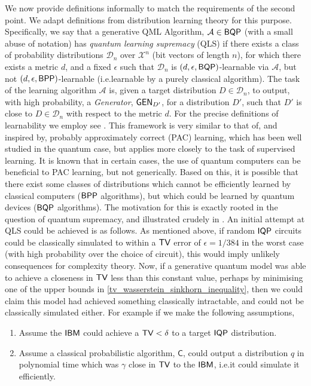 We now provide definitions informally to match the requirements of the second point. We adapt definitions from distribution learning theory\cite{kearns_learnability_1994} for this purpose. Specifically, we say that a generative QML Algorithm, $\mathcal{A}\in \textsf{BQP}$ (with a small abuse of notation) has %
\textit{quantum learning supremacy} (QLS) if there exists a class of probability distributions 
$\mathcal{D}_n$ over $\mathcal X^n$ (bit vectors of length $n$), 
for which there exists a metric $d$, and a fixed $\epsilon$ such that 
$\mathcal{D}_n$ is $(d ,\epsilon, \textsf{BQP})$-learnable via $\mathcal{A}$, 
but not $\left( d ,\epsilon, \textsf{BPP} \right)$-learnable (i.e.\@ learnable by a purely classical algorithm). The task of the learning algorithm $\mathcal{A}$ is, given a target distribution $D\in \mathcal D_n$,
to output, with high probability, a \textit{Generator}, 
$\operatorname{\textsf{GEN}}_{D'}$, for a distribution $D'$, 
such that $D'$ is close to $D \in \mathcal{D}_n$ with respect to the metric $d$. 
For the precise definitions of learnability we employ see .
This framework is very similar to that of, and inspired by, probably approximately correct (PAC) learning, which has been well studied in the quantum case\cite{arunachalam_survey_2017}, but applies more closely to the task of supervised learning. It is known that in certain cases, the use of quantum computers can be beneficial to PAC learning, but not generically\cite{arunachalam_quantum_2019}. Based on this, it is possible that there exist some classes of distributions which cannot be efficiently learned by classical computers ($\textsf{BPP}$ algorithms), but which could be learned by quantum devices ($\textsf{BQP}$ algorithms). The motivation for this is exactly rooted in the question of quantum supremacy, and illustrated crudely in . An initial attempt at QLS could be achieved is as follows. As mentioned above, if random $\operatorname{\textsf{IQP}}$ circuits could be classically simulated to within a $\operatorname{\textsf{TV}}$ error of $\epsilon = 1/384$\cite{bremner_average-case_2016} in the worst case (with high probability over the choice of circuit), this would imply unlikely consequences for complexity theory. Now, if a generative quantum model was able to achieve a closeness in $\operatorname{\textsf{TV}}$ less than this constant value, perhaps by minimising one of the upper bounds in \eqref{tv_wasserstein_sinkhorn_inequality}, then we could claim this model had achieved something classically intractable, and could not be classically simulated either. For example if we make the following assumptions,
\begin{enumerate}
    \item Assume the $\textsf{IBM}$ could achieve a $\operatorname{\textsf{TV}} < \delta$ to a target $\operatorname{\textsf{IQP}}$ distribution. 
    \item Assume a classical probabilistic algorithm, $\mathsf{C}$, could output a distribution $q$ in polynomial time which was $\gamma$ close in $\operatorname{\textsf{TV}}$ to the $\textsf{IBM}$, i.e.\@ it could simulate it efficiently.
\end{enumerate}
